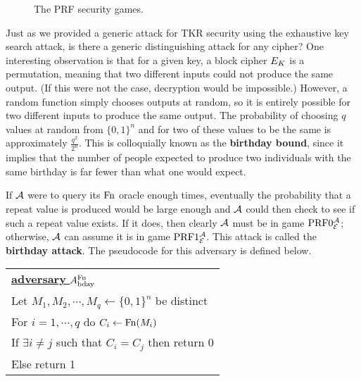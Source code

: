\begin{figure}
	\centering
\caption{The PRF security games.}
\label{fig:prf}
\end{figure} 

Just as we provided a generic attack for TKR security using the exhaustive key search attack, is there a generic distinguishing attack for any cipher? One interesting observation is that for a given key, a block cipher $E_K$ is a permutation, meaning that two different inputs could not produce the same output. (If this were not the case, decryption would be impossible.) However, a random function simply chooses outputs at random, so it is entirely possible for two different inputs to produce the same output. The probability of choosing $q$ values at random from $\{0,1\}^n$ and for two of these values to be the same is approximately $\frac{q^2}{2^n}$. This is colloquially known as the \textbf{birthday bound}, since it implies that the number of people expected to produce two individuals with the same birthday is far fewer than what one would expect. 

If ${\mathcal A}$ were to query its $\textnormal{Fn}$ oracle enough times, eventually the probability that a repeat value is produced would be large enough and ${\mathcal A}$ could then check to see if such a repeat value exists. If it does, then clearly ${\mathcal A}$ must be in game $\textnormal{PRF}0_{{\cal E}}^{\mathcal A}$; otherwise, ${\mathcal A}$ can assume it is in game $\textnormal{PRF}1_{{\cal E}}^{\mathcal A}$. This attack is called the \textbf{birthday attack}. The pseudocode for this adversary is defined below.
 
\begin{center}
\begin{tabular}{l}
	\underline{\textbf{adversary} $A^{\textnormal{Fn}}_{\text{bday}}$} \\
	Let $M_1, M_2, \cdots, M_q \gets \{0,1\}^n$ be distinct \\
	For $i=1, \cdots, q$ do $C_i \gets \textnormal{Fn}(M_i)$ \\
	If $\exists i \neq j$ such that $C_i = C_j$ then return 0 \\
	Else return 1
\end{tabular}
\end{center}

